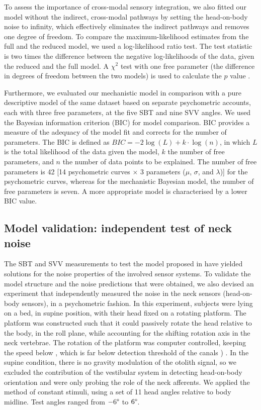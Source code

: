 To assess the importance of cross-modal sensory integration, we also fitted our model without the indirect, cross-modal pathways by setting the head-on-body noise to infinity, which effectively eliminates the indirect pathways and removes one degree of freedom. To compare the maximum-likelihood estimates from the full and the reduced model, we used a log-likelihood ratio test. The test statistic is two times the difference between the negative log-likelihoods of the data, given the reduced and the full model. A $\chi^2$ test with one free parameter (the difference in degrees of freedom between the two models) is used to calculate the $p$ value \cite{dobson2001}.

Furthermore, we evaluated our mechanistic model in comparison with a pure descriptive model of the same dataset based on separate psychometric accounts, each with three free parameters, at the five SBT and nine SVV angles. We used the Bayesian information criterion (BIC) for model comparison. BIC provides a measure of the adequacy of the model fit and corrects for the number of parameters. The BIC is defined as $BIC = -2 \log(L) + k \cdot \log(n)$, in which $L$ is the total likelihood of the data given the model, $k$ the number of free parameters, and $n$ the number of data points to be explained. The number of free parameters is 42 [14 psychometric curves $\times$ 3 parameters ($\mu$, $\sigma$, and $\lambda$)] for the psychometric curves, whereas for the mechanistic Bayesian model, the number of free parameters is seven. A more appropriate model is characterised by a lower BIC value.


\subsection{Model validation: independent test of neck noise}
\label{p1:sec:model:necknoise}

The SBT and SVV measurements to test the model proposed in  have yielded solutions for the noise properties of the involved sensor systems. To validate the model structure and the noise predictions that were obtained, we also devised an experiment that independently measured the noise in the neck sensors (head-on-body sensors), in a psychometric fashion. In this experiment, subjects were lying on a bed, in supine position, with their head fixed on a rotating platform. The platform was constructed such that it could passively rotate the head relative to the body, in the roll plane, while accounting for the shifting rotation axis in the neck vertebrae. The rotation of the platform was computer controlled, keeping the speed below , which is far below detection threshold of the canals ) \cite{benson1989}. In the supine condition, there is no gravity modulation of the otolith signal, so we excluded the contribution of the vestibular system in detecting head-on-body orientation and were only probing the role of the neck afferents. We applied the method of constant stimuli, using a set of 11 head angles relative to body midline. Test angles ranged from $-6\degree$ to $6\degree$.

